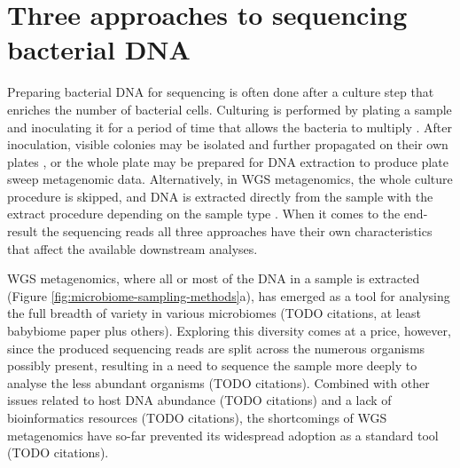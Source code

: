 \documentclass[officiallayout]{tktla}
\begin{document}
\section{Three approaches to sequencing bacterial DNA}
\label{three-approaches-to-metagenomics}


Preparing bacterial DNA for sequencing is often done after a
culture step that enriches the number of bacterial cells. Culturing
is performed by plating a sample and inoculating it for a period of
time that allows the bacteria to multiply
\citep{sanders2012aseptic}. After inoculation, visible colonies may be
isolated and further propagated on their own plates
\citep{sanders2012aseptic}, or the whole plate may be prepared for DNA
extraction to produce plate sweep metagenomic data. Alternatively, in
WGS metagenomics, the whole culture procedure is skipped, and DNA is
extracted directly from the sample with the extract procedure
depending on the sample type \citep{bachmann2018advances}. When it
comes to the end-result \textemdash the sequencing reads \textemdash
all three approaches have their own characteristics that affect the
available downstream analyses.


WGS metagenomics, where all or most of the DNA in a sample is
extracted (Figure \ref{fig:microbiome-sampling-methods}a), has emerged
as a tool for analysing the full breadth of variety in various
microbiomes (TODO citations, at least babybiome paper plus
others). Exploring this diversity comes at a price, however, since the
produced sequencing reads are split across the numerous organisms
possibly present, resulting in a need to sequence the sample more
deeply to analyse the less abundant organisms (TODO
citations). Combined with other issues related to host DNA abundance
(TODO citations) and a lack of bioinformatics resources (TODO
citations), the shortcomings of WGS metagenomics have so-far prevented
its widespread adoption as a standard tool (TODO citations).
\end{document}
